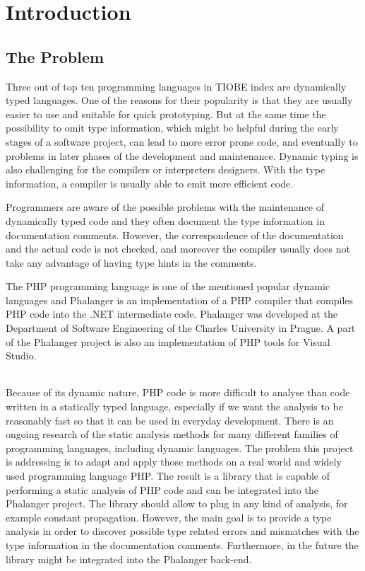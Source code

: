 \chapter{Introduction}

    \section{The Problem}
    
    Three out of top ten programming languages in TIOBE index\cite{tiobe} 
    are dynamically typed languages. One of the reasons for their popularity 
    is that they are usually easier to use and suitable for quick prototyping.
    But at the same time the possibility to omit type information, which might 
    be helpful during the early stages of a software project, can lead to more 
    error prone code, and eventually to problems in later phases of the 
    development and maintenance. Dynamic typing is also challenging for the 
    compilers or interpreters designers. With the type information, 
    a compiler is usually able to emit more efficient code.
    
    Programmers are aware of the possible problems with the maintenance of 
    dynamically typed code and they often document the type information in 
    documentation comments. However, the correspondence of the documentation 
    and the actual code is not checked, and moreover the compiler usually 
    does not take any advantage of having type hints in the comments.
    
    The PHP programming language is one of the mentioned popular dynamic 
    languages and Phalanger \cite{benda2006phalanger} is an implementation of a PHP compiler 
    that compiles PHP code into the .NET intermediate code. Phalanger was 
    developed at the Department of Software Engineering 
    of the Charles University in Prague. A part of the 
    Phalanger project is also an implementation of PHP tools 
    for Visual Studio.

    \subparagraph*{}    
    Because of its dynamic nature, PHP code is more difficult to analyse 
    than code written in a statically typed language, especially if we want the 
    analysis to be reasonably fast so that it can be used 
    in everyday development.  There is an ongoing research of the 
    static analysis methods for many different families of programming languages, 
    including dynamic languages. The problem this project is addressing 
    is to adapt and apply those methods on a real world and widely 
    used programming language PHP. The result is a library that is capable of 
    performing a static analysis of PHP code and can be integrated into 
    the Phalanger project. The library should allow to plug in any 
    kind of analysis, for example constant propagation. However, the main goal 
    is to provide a type analysis in order to discover possible type 
    related errors and mismatches with the type information in the 
    documentation comments. Furthermore, in the future the library 
    might be integrated into the Phalanger back-end.        
    
